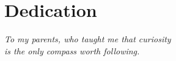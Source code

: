 \chapter*{Dedication}

\begin{center}
\itshape
To my parents, who taught me that curiosity\\
is the only compass worth following.
\end{center}

\newpage

\setcounter{page}{1}
\renewcommand{\contentsname}{Table of Contents}
\tableofcontents
\newpage

\listoftables
{}
\newpage

\listoffigures
{}
\newpage


